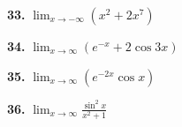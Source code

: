 \begin{minipage}[t]{0.485\textwidth}
\vspace{0.5em}

\noindent
\parbox[t]{0.48\linewidth}{\textbf{33.} $\displaystyle \lim_{x \to -\infty} (x^2 + 2x^7)$}\hfill
\parbox[t]{0.48\linewidth}{\textbf{34.} $\displaystyle \lim_{x \to \infty} (e^{-x} + 2\cos 3x)$}

\vspace{0.5em}

\noindent
\parbox[t]{0.48\linewidth}{\textbf{35.} $\displaystyle \lim_{x \to \infty} (e^{-2x} \cos x)$}\hfill
\parbox[t]{0.48\linewidth}{\textbf{36.} $\displaystyle \lim_{x \to \infty} \frac{\sin^2 x}{x^2 + 1}$}

\vspace{0.8em}
\noindent{\color{stewartcyan}\rule{\linewidth}{0.6pt}}

\end{minipage}%
\hfill
